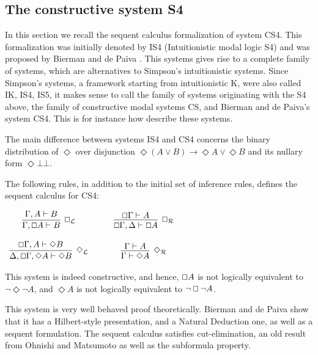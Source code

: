 \documentclass{article}
\renewcommand{\Box}{\oblong}
\begin{document}
\subsection{The constructive system S4} 

In this section we recall the sequent calculus formalization of system
CS4.  This formalization was initially denoted by IS4 (Intuitionistic
modal logic S4) and was proposed by Bierman and de Paiva \cite{CS4}.
This systems gives rise to a complete family of systems, which are
alternatives to Simpson's intuitionistic systems. Since Simpson's
systems, a framework starting from intuitionistic K, were also called
IK, IS4, IS5, it makes sense to call the family of systems originating
with the S4 above, the family of constructive modal systems CS, and
Bierman and de Paiva's system CS4.  This is for instance how
\cite{arisaka2015} describe these systems.

The main difference between systems IS4 and CS4 concerns the binary
distribution of $\Diamond$ over disjunction
$\Diamond (A \lor B) \to \Diamond A \lor \Diamond B$
and its nullary form $\Diamond \bot\bot$.

The following rules, in addition to
the initial set of inference rules, defines the sequent calculus for CS4:
\begin{center}
  \begin{math}
    \begin{array}{ccccc}              
      \infer[\Box_{\mathcal{L}}]{\Gamma, \Box A \vdash B}{
        \Gamma,A \vdash B
      }
      & \quad &
      \infer[\Box_{\mathcal{R}}]{\Box\Gamma,\Delta \vdash \Box A}{
        \Box \Gamma \vdash A
      }\\\\
      \infer[\Diamond_{\mathcal{L}}]{\Delta,\Box\Gamma,\Diamond A \vdash \Diamond B}{
        \Box\Gamma,A \vdash \Diamond B
      }
      & \quad &
      \infer[\Diamond_{\mathcal{R}}]{\Gamma \vdash \Diamond A}{
        \Gamma \vdash A
      }
    \end{array}        
  \end{math}
\end{center}
This system is indeed constructive, and hence, $\Box A$ is not
logically equivalent to $\lnot \Diamond \lnot A$, and $\Diamond A$ is
not logically equivalent to $\lnot \Box \lnot A$.

This system is very well behaved proof theoretically. Bierman and de
Paiva show that it has a Hilbert-style presentation, and a Natural
Deduction one, as well as a sequent formulation. The sequent calculus
satisfies cut-elimination, an old result from Ohnishi and Matsumoto
\cite{ohnishi1957} as well as the subformula property.
\end{document}
